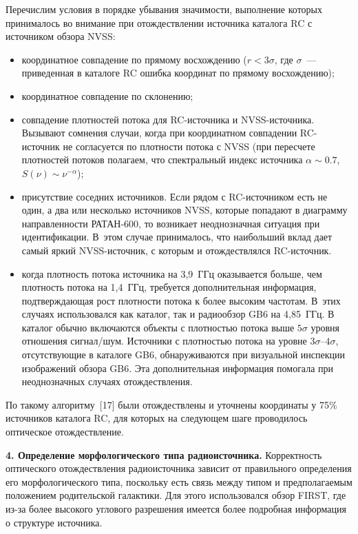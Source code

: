 \begin{multicols}{2}
      Перечислим условия в порядке убывания значимости, выполнение которых 
принималось во внимание при отождествлении источника каталога RC с источником 
обзора NVSS:
\begin{itemize}
\item координатное совпадение по прямому восхождению ($r < 3\sigma$, где $\sigma$~--- 
приведенная в каталоге RC ошибка координат по прямому восхождению); 
\item координатное совпадение по склонению; 
\item совпадение плотностей потока для RC-ис\-точ\-ни\-ка и NVSS-ис\-точ\-ни\-ка. Вызывают 
сомнения случаи, когда при координатном совпадении RC-ис\-точ\-ник не согласуется по 
плотности потока с NVSS (при пересчете плотностей потоков полагаем, что спектральный 
индекс источника $\alpha\sim 0.7$, $S(\nu) \sim \nu^{-\alpha}$); 
\item присутствие соседних источников. Если рядом с RC-ис\-точ\-ни\-ком есть не один, а два 
или несколько источников NVSS, которые попадают в диаграмму направленности 
РАТАН-600, то возникает неоднозначная ситуация при идентификации. В~этом случае 
принималось, что наибольший вклад дает самый яркий NVSS-ис\-точ\-ник, с которым и 
отождествлялся RC-источник. 
\item когда плотность потока источника на 3,9~ГГц оказывается больше, чем плотность 
потока на 1,4~ГГц, требуется дополнительная информация, подтверждающая рост 
плотности потока к более высоким частотам. В~этих случаях использовался как каталог, 
так и радиообзор GB6 на 4,85~ГГц. В каталог обычно включаются объекты с плотностью 
потока выше $5\sigma$ уровня отношения сигнал/шум. Источники с плот\-ностью потока на 
уровне $3\sigma\mbox{--}4\sigma$, отсутствующие в каталоге GB6, обнаруживаются при 
визуальной инспекции изображений обзора GB6. Эта дополнительная информация 
помогала при неоднозначных случаях отождествления.
  \end{itemize}
  

  
По такому алгоритму~[17] были отождествлены и уточнены координаты у 75\% источников 
каталога RC, для которых на следующем шаге проводилось оптическое отождествление.


\textbf{4. Определение морфологического типа ра\-дио\-ис\-точ\-ни\-ка.} Корректность оптического 
отождествления радиоисточника зависит от правильного определения его морфологического 
типа, поскольку есть связь между типом и предполагаемым положением родительской 
галактики. Для этого использовался обзор FIRST, где из-за более высокого углового 
разрешения имеется более подробная информация о структуре источника. 
      

\end{multicols}
